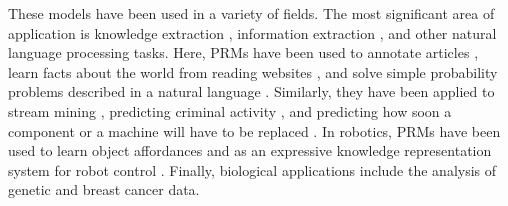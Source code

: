 These models have been used in a variety of fields. The most significant area of
application is knowledge extraction \citep{DBLP:conf/naacl/PoonV10}, information
extraction \citep{bunescu2007statistical}, and other natural language processing
tasks. Here, PRMs have been used to annotate articles
\citep{DBLP:conf/emnlp/VerbekeAMFDR12}, learn facts about the world from reading
websites \citep{DBLP:conf/aaai/CarlsonBKSHM10}, and solve simple probability
problems described in a natural language \citep{DBLP:conf/ijcai/DriesKDBR17}.
Similarly, they have been applied to stream mining
\citep{DBLP:conf/icdm/ChandraSKTA14}, predicting criminal activity
\citep{DBLP:conf/sdm/DelaneyFCWJ10}, and predicting how soon a component or a
machine will have to be replaced \citep{vlasselaer2012statistical}. In robotics,
PRMs have been used to learn object affordances
\citep{DBLP:conf/ilp/MoldovanORMS11,DBLP:conf/icra/MoldovanMOSR12,DBLP:conf/iros/MoldovanR14}
and as an expressive knowledge representation system for robot control
\citep{DBLP:conf/icra/JainMB09}. Finally, biological applications include the
analysis of genetic \citep{DBLP:journals/jcb/SakhanenkoG12} and breast cancer
\citep{DBLP:conf/ilp/Corte-RealD017,DBLP:conf/pkdd/NassifKBPSC13} data.
